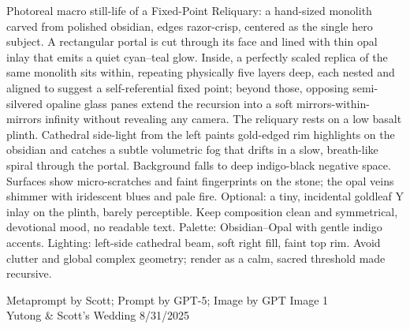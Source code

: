 \documentclass[12pt]{article}
\begin{document}
\noindent
\begin{adjustbox}{max size={\textwidth}{\textheight}}
\begin{varwidth}{\textwidth}
\RaggedRight
\footnotesize
Photoreal macro still-life of a Fixed-Point Reliquary: a hand-sized monolith carved from polished obsidian, edges razor-crisp, centered as the single hero subject. A rectangular portal is cut through its face and lined with thin opal inlay that emits a quiet cyan–teal glow. Inside, a perfectly scaled replica of the same monolith sits within, repeating physically five layers deep, each nested and aligned to suggest a self-referential fixed point; beyond those, opposing semi-silvered opaline glass panes extend the recursion into a soft mirrors-within-mirrors infinity without revealing any camera. The reliquary rests on a low basalt plinth. Cathedral side-light from the left paints gold-edged rim highlights on the obsidian and catches a subtle volumetric fog that drifts in a slow, breath-like spiral through the portal. Background falls to deep indigo-black negative space. Surfaces show micro-scratches and faint fingerprints on the stone; the opal veins shimmer with iridescent blues and pale fire. Optional: a tiny, incidental goldleaf Y inlay on the plinth, barely perceptible. Keep composition clean and symmetrical, devotional mood, no readable text. Palette: Obsidian–Opal with gentle indigo accents. Lighting: left-side cathedral beam, soft right fill, faint top rim. Avoid clutter and global complex geometry; render as a calm, sacred threshold made recursive.
\end{varwidth}
\end{adjustbox}
\vfill
{\raggedleft\footnotesize
Metaprompt by Scott; Prompt by GPT-5; Image by GPT Image 1 \\
Yutong \& Scott's Wedding 8/31/2025\par}
\end{document}
